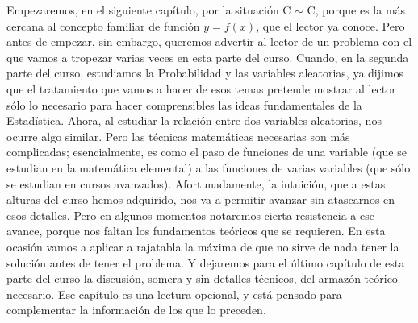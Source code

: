 Empezaremos, en el siguiente capítulo, por la situación C $\sim$ C, porque es la más cercana al concepto familiar de función $y=f(x)$, que el lector ya conoce. Pero antes de empezar, sin embargo, queremos advertir al lector de un problema con el que vamos a tropezar varias veces en esta parte del curso. Cuando, en la segunda parte del curso, estudiamos la Probabilidad y las variables aleatorias, ya dijimos que el tratamiento que vamos a hacer de esos temas pretende mostrar al lector sólo lo necesario para hacer comprensibles las ideas fundamentales de la Estadística. Ahora, al estudiar la relación entre dos variables aleatorias, nos ocurre algo  similar. Pero las técnicas matemáticas necesarias son más complicadas; esencialmente, es como el paso de funciones de una variable (que se estudian en la matemática elemental) a las funciones de varias variables (que sólo se estudian en cursos avanzados). Afortunadamente, la intuición, que a estas alturas del curso hemos adquirido, nos va a permitir avanzar sin atascarnos en esos detalles. Pero en algunos momentos notaremos cierta resistencia a ese avance, porque nos faltan los fundamentos teóricos que se requieren. En esta ocasión vamos a aplicar a rajatabla la máxima de que no sirve de nada tener la solución antes de tener el problema. Y dejaremos para el último capítulo de esta parte del curso la discusión, somera y sin detalles técnicos, del armazón teórico necesario. Ese capítulo es una lectura opcional, y está pensado para complementar la información de los que lo preceden.
